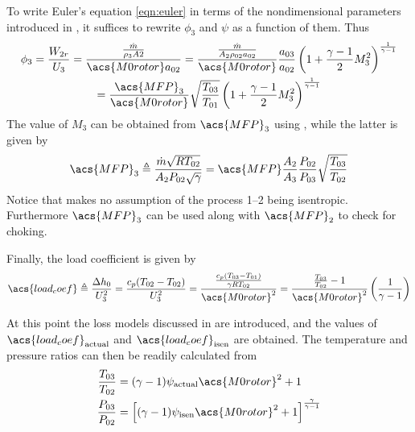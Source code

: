 To write Euler's equation \ref{eqn:euler} in terms of the nondimensional parameters introduced in , it suffices to rewrite $\phi_3$ and $\psi$ as a function of them. Thus
\begin{multline}
    \label{eqn:phi2_dimensionless}
    \phi_3 = \frac{W_{2r}}{U_3} 
           = \frac{\frac{\dot{m}}{\rho_3 A2}}{\acs{M0rotor} a_{02}}
           = \frac{\MFPalt{2}}{\acs{M0rotor}} \frac{a_{03}}{a_{02}} \stagdensratio{3} \\ 
           = \frac{\acs{MFP}_3}{\acs{M0rotor}} \sqrt{\frac{T_{03}}{T_{01}}} \stagdensratio{3}
\end{multline}
The value of $M_3$ can be obtained from $\acs{MFP}_3$ using , while the latter is given by
\begin{equation}
    \label{eqn:mfp2mfp2}
    \acs{MFP}_3 \triangleq \MFP{2} = \acs{MFP} \frac{A_2}{A_3} \frac{P_{02}}{P_{03}} \sqrt{\frac{T_{03}}{T_{02}}}
\end{equation}
Notice that  makes no assumption of the process 1--2 being isentropic. Furthermore $\acs{MFP}_3$ can be used along with $\acs{MFP}_2$ to check for choking.

Finally, the load coefficient is given by
\begin{equation}
    \acs{load_coef}\triangleq \frac{\Delta h_0}{U_3^2}
                      = \frac{c_p(T_{02}-T_{02})}{U_3^2}
                      = \frac{\frac{c_p(T_{03}-T_{01})}{\gamma R T_{02}}}
                                    {\acs{M0rotor}^2}
                      = \frac{\frac{T_{03}}{T_{02}}-1}
                                  {\acs{M0rotor}^2}
                        \left(\frac{1}{\gamma-1}\right)
\end{equation}

At this point the loss models discussed in  are introduced, 
and the values of $\acs{load_coef}_{\text{actual}}$ and $\acs{load_coef}_{\text{isen}}$ are obtained.
The temperature and pressure ratios can then be readily calculated from
\begin{align}
    \label{eqn:psi2Tratio}
    \frac{T_{03}}{T_{02}} &= (\gamma - 1)\psi_{\text{actual}} \acs{M0rotor}^2 + 1 \\
    \label{eqn:psi2Pratio}
    \frac{P_{03}}{P_{02}} &= \left[(\gamma - 1)\psi_{\text{isen}} \acs{M0rotor}^2 + 1\right]^\frac{\gamma}{\gamma-1}
\end{align}

